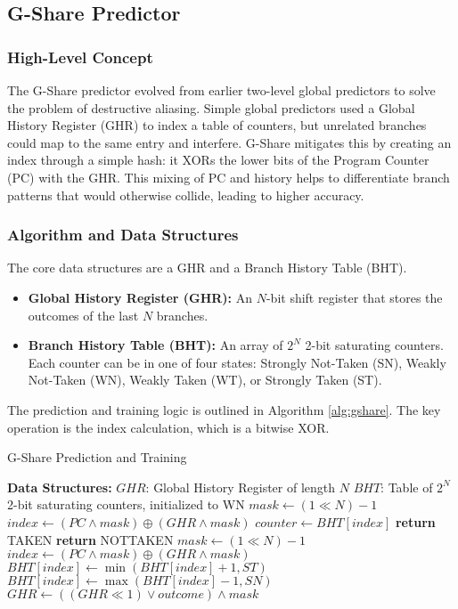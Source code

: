 \documentclass[sigconf, screen]{acmart}
\begin{document}
\subsection{G-Share Predictor}

\subsubsection{High-Level Concept}
The G-Share predictor \cite{mcfarling1993combining} evolved from earlier two-level global predictors to solve the problem of destructive aliasing. Simple global predictors used a Global History Register (GHR) to index a table of counters, but unrelated branches could map to the same entry and interfere. G-Share mitigates this by creating an index through a simple hash: it XORs the lower bits of the Program Counter (PC) with the GHR. This mixing of PC and history helps to differentiate branch patterns that would otherwise collide, leading to higher accuracy.

\subsubsection{Algorithm and Data Structures}
The core data structures are a GHR and a Branch History Table (BHT).
\begin{itemize}
    \item \textbf{Global History Register (GHR):} An $N$-bit shift register that stores the outcomes of the last $N$ branches.
    \item \textbf{Branch History Table (BHT):} An array of $2^N$ 2-bit saturating counters. Each counter can be in one of four states: Strongly Not-Taken (SN), Weakly Not-Taken (WN), Weakly Taken (WT), or Strongly Taken (ST).
\end{itemize}
The prediction and training logic is outlined in Algorithm \ref{alg:gshare}. The key operation is the index calculation, which is a bitwise XOR.

\begin{algorithm}[H]
\caption{G-Share Prediction and Training}
\label{alg:gshare}
\begin{algorithmic}[1]
\Statex \textbf{Data Structures:}
\State $GHR$: Global History Register of length $N$
\State $BHT$: Table of $2^N$ 2-bit saturating counters, initialized to WN
\Statex
{}
    \State $mask \gets (1 \ll N) - 1$
    \State $index \gets (PC \land mask) \oplus (GHR \land mask)$
    \State $counter \gets BHT[index]$
        \State \textbf{return} TAKEN
    \Else
        \State \textbf{return} NOTTAKEN
    \EndIf
\EndProcedure
\Statex
{}
    \State $mask \gets (1 \ll N) - 1$
    \State $index \gets (PC \land mask) \oplus (GHR \land mask)$
        \State $BHT[index] \gets \min(BHT[index] + 1, ST)$
    \Else
        \State $BHT[index] \gets \max(BHT[index] - 1, SN)$
    \EndIf
    \State $GHR \gets ((GHR \ll 1) \lor outcome) \land mask$
\EndProcedure
\end{algorithmic}
\end{algorithm}
\end{document}

